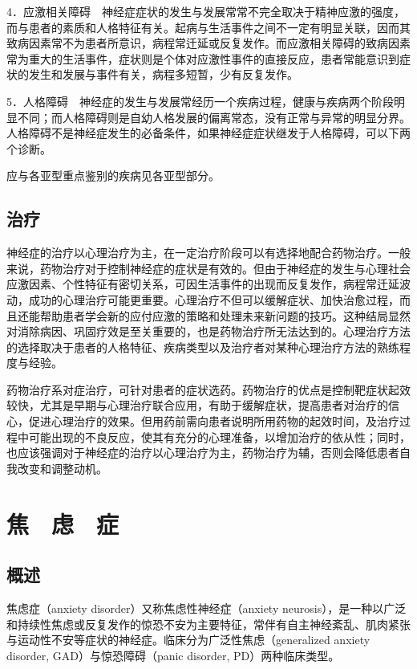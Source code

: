 4．应激相关障碍　神经症症状的发生与发展常常不完全取决于精神应激的强度，而与患者的素质和人格特征有关。起病与生活事件之间不一定有明显关联，因而其致病因素常不为患者所意识，病程常迁延或反复发作。而应激相关障碍的致病因素常为重大的生活事件，症状则是个体对应激性事件的直接反应，患者常能意识到症状的发生和发展与事件有关，病程多短暂，少有反复发作。

5．人格障碍　神经症的发生与发展常经历一个疾病过程，健康与疾病两个阶段明显不同；而人格障碍则是自幼人格发展的偏离常态，没有正常与异常的明显分界。人格障碍不是神经症发生的必备条件，如果神经症症状继发于人格障碍，可以下两个诊断。

应与各亚型重点鉴别的疾病见各亚型部分。

\subsection{治疗}

神经症的治疗以心理治疗为主，在一定治疗阶段可以有选择地配合药物治疗。一般来说，药物治疗对于控制神经症的症状是有效的。但由于神经症的发生与心理社会应激因素、个性特征有密切关系，可因生活事件的出现而反复发作，病程常迁延波动，成功的心理治疗可能更重要。心理治疗不但可以缓解症状、加快治愈过程，而且还能帮助患者学会新的应付应激的策略和处理未来新问题的技巧。这种结局显然对消除病因、巩固疗效是至关重要的，也是药物治疗所无法达到的。心理治疗方法的选择取决于患者的人格特征、疾病类型以及治疗者对某种心理治疗方法的熟练程度与经验。

药物治疗系对症治疗，可针对患者的症状选药。药物治疗的优点是控制靶症状起效较快，尤其是早期与心理治疗联合应用，有助于缓解症状，提高患者对治疗的信心，促进心理治疗的效果。但用药前需向患者说明所用药物的起效时间，及治疗过程中可能出现的不良反应，使其有充分的心理准备，以增加治疗的依从性；同时，也应该强调对于神经症的治疗以心理治疗为主，药物治疗为辅，否则会降低患者自我改变和调整动机。

\section{焦　虑　症}

\subsection{概述}

焦虑症（anxiety disorder）又称焦虑性神经症（anxiety
neurosis），是一种以广泛和持续性焦虑或反复发作的惊恐不安为主要特征，常伴有自主神经紊乱、肌肉紧张与运动性不安等症状的神经症。临床分为广泛性焦虑（generalized
anxiety disorder, GAD）与惊恐障碍（panic disorder, PD）两种临床类型。

